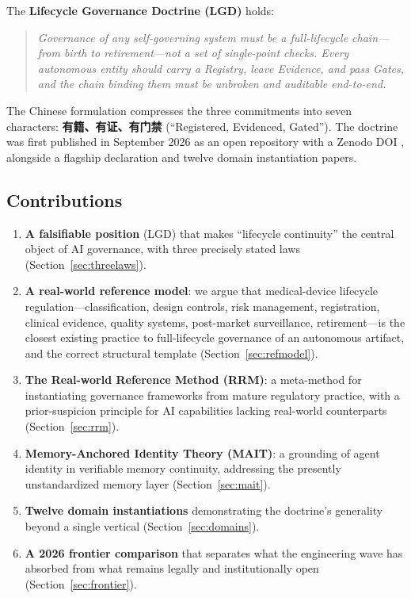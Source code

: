 \documentclass[12pt]{article}
\begin{document}
The \textbf{Lifecycle Governance Doctrine (LGD)} holds:

\begin{quote}
\emph{Governance of any self-governing system must be a full-lifecycle chain---from birth to retirement---not a set of single-point checks. Every autonomous entity should carry a Registry, leave Evidence, and pass Gates, and the chain binding them must be unbroken and auditable end-to-end.}
\end{quote}

The Chinese formulation compresses the three commitments into seven characters: \textbf{有籍、有证、有门禁} (``Registered, Evidenced, Gated''). The doctrine was first published in September 2026 as an open repository with a Zenodo DOI \cite{lgdrepo}, alongside a flagship declaration and twelve domain instantiation papers.

\subsection{Contributions}

\begin{enumerate}[itemsep=2pt]
  \item \textbf{A falsifiable position} (LGD) that makes ``lifecycle continuity'' the central object of AI governance, with three precisely stated laws (Section~\ref{sec:threelaws}).
  \item \textbf{A real-world reference model}: we argue that medical-device lifecycle regulation---classification, design controls, risk management, registration, clinical evidence, quality systems, post-market surveillance, retirement---is the closest existing practice to full-lifecycle governance of an autonomous artifact, and the correct structural template (Section~\ref{sec:refmodel}).
  \item \textbf{The Real-world Reference Method (RRM)}: a meta-method for instantiating governance frameworks from mature regulatory practice, with a prior-suspicion principle for AI capabilities lacking real-world counterparts (Section~\ref{sec:rrm}).
  \item \textbf{Memory-Anchored Identity Theory (MAIT)}: a grounding of agent identity in verifiable memory continuity, addressing the presently unstandardized memory layer (Section~\ref{sec:mait}).
  \item \textbf{Twelve domain instantiations} demonstrating the doctrine's generality beyond a single vertical (Section~\ref{sec:domains}).
  \item \textbf{A 2026 frontier comparison} that separates what the engineering wave has absorbed from what remains legally and institutionally open (Section~\ref{sec:frontier}).
\end{enumerate}
\end{document}
